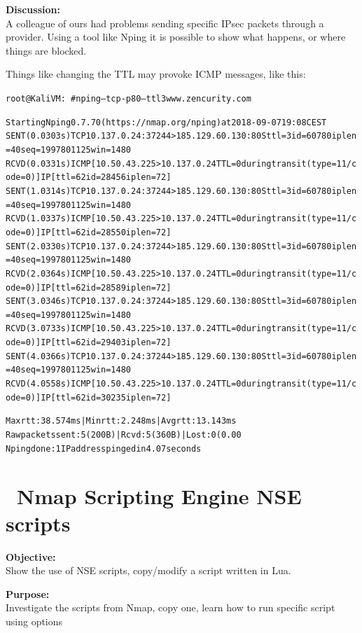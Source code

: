 \documentclass[a4paper,11pt,notitlepage]{report}
\begin{document}
{\bf Discussion:}\\
A colleague of ours had problems sending specific IPsec packets through a provider. Using a tool like Nping it is possible to show what happens, or where things are blocked.

Things like changing the TTL may provoke ICMP messages, like this:
\begin{alltt}\footnotesize
root@KaliVM:~# nping --tcp -p 80 --ttl 3 www.zencurity.com

Starting Nping 0.7.70 ( https://nmap.org/nping ) at 2018-09-07 19:08 CEST
SENT (0.0303s) TCP 10.137.0.24:37244 > 185.129.60.130:80 S ttl=3 id=60780 iplen=40  seq=1997801125 win=1480
RCVD (0.0331s) ICMP [10.50.43.225 > 10.137.0.24 TTL=0 during transit (type=11/code=0) ] IP [ttl=62 id=28456 iplen=72 ]
SENT (1.0314s) TCP 10.137.0.24:37244 > 185.129.60.130:80 S ttl=3 id=60780 iplen=40  seq=1997801125 win=1480
RCVD (1.0337s) ICMP [10.50.43.225 > 10.137.0.24 TTL=0 during transit (type=11/code=0) ] IP [ttl=62 id=28550 iplen=72 ]
SENT (2.0330s) TCP 10.137.0.24:37244 > 185.129.60.130:80 S ttl=3 id=60780 iplen=40  seq=1997801125 win=1480
RCVD (2.0364s) ICMP [10.50.43.225 > 10.137.0.24 TTL=0 during transit (type=11/code=0) ] IP [ttl=62 id=28589 iplen=72 ]
SENT (3.0346s) TCP 10.137.0.24:37244 > 185.129.60.130:80 S ttl=3 id=60780 iplen=40  seq=1997801125 win=1480
RCVD (3.0733s) ICMP [10.50.43.225 > 10.137.0.24 TTL=0 during transit (type=11/code=0) ] IP [ttl=62 id=29403 iplen=72 ]
SENT (4.0366s) TCP 10.137.0.24:37244 > 185.129.60.130:80 S ttl=3 id=60780 iplen=40  seq=1997801125 win=1480
RCVD (4.0558s) ICMP [10.50.43.225 > 10.137.0.24 TTL=0 during transit (type=11/code=0) ] IP [ttl=62 id=30235 iplen=72 ]

Max rtt: 38.574ms | Min rtt: 2.248ms | Avg rtt: 13.143ms
Raw packets sent: 5 (200B) | Rcvd: 5 (360B) | Lost: 0 (0.00%
Nping done: 1 IP address pinged in 4.07 seconds
\end{alltt}

\chapter{\faInfoCircle\ Nmap Scripting Engine NSE scripts}
\label{ex:nmap-nse}

{\bf Objective:} \\
Show the use of NSE scripts, copy/modify a script written in Lua.

{\bf Purpose:}\\
Investigate the scripts from Nmap, copy one, learn how to run specific script using options
\end{document}
